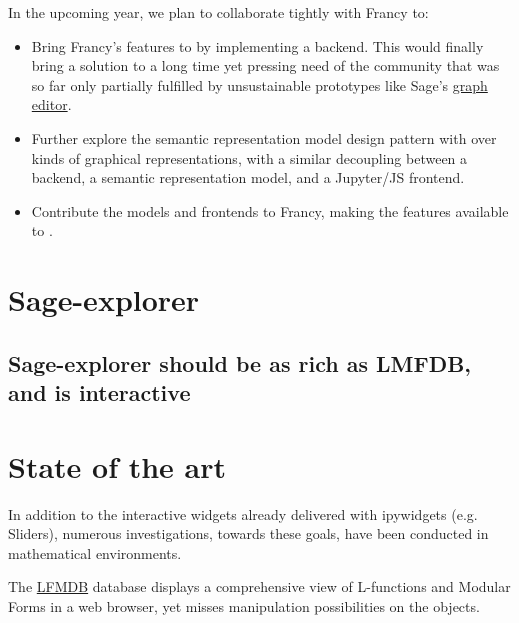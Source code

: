\documentclass{deliverablereport}
\begin{document}
In the upcoming year, we plan to collaborate tightly with Francy to:
\begin{itemize}
\item Bring Francy's features to \Sage by implementing a backend. This
  would finally bring a solution to a long time yet pressing need of
  the community that was so far only partially fulfilled by
  unsustainable prototypes like Sage's
  \href{http://doc.sagemath.org/html/en/reference/graphs/sage/graphs/graph_editor.html}{graph editor}.
\item Further explore the semantic representation model design pattern
  with over kinds of graphical representations, with a similar
  decoupling between a \Sage backend, a semantic representation model,
  and a Jupyter/JS frontend.
\item Contribute the models and frontends to Francy, making the
  features available to \GAP.
\end{itemize}

\section{Sage-explorer}
\label{section:sage-explorer}


\subsection{Sage-explorer should be as rich as LMFDB, and is interactive}

\section{State of the art}

In addition to the interactive widgets already delivered with ipywidgets (e.g. Sliders), numerous investigations, towards these goals, have been conducted in mathematical environments.

The \href{http://www.lmfdb.org/}{LFMDB} database displays a
comprehensive view of L-functions and Modular Forms in a web browser,
yet misses manipulation possibilities on the objects.
\end{document}
